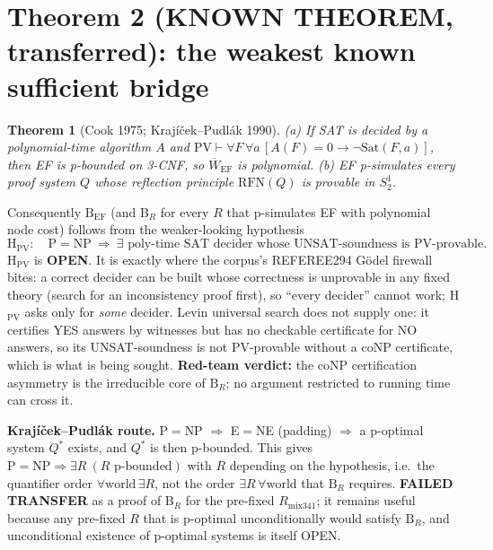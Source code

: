 \documentclass[11pt]{article}
\newtheorem{theorem}{Theorem}
\begin{document}
\section{Theorem 2 (KNOWN THEOREM, transferred): the weakest known sufficient bridge}
\begin{theorem}[Cook 1975; Krajíček--Pudlák 1990]
(a) If SAT is decided by a polynomial-time algorithm $A$ and $\mathrm{PV}\vdash
\forall F\,\forall a\,[A(F)=0\to\neg\mathrm{Sat}(F,a)]$, then EF is p-bounded on 3-CNF, so
$\overline W_{\mathrm{EF}}$ is polynomial.
(b) EF p-simulates every proof system $Q$ whose reflection principle $\mathrm{RFN}(Q)$ is
provable in $S^1_2$.
\end{theorem}
Consequently $\mathrm B_{\mathrm{EF}}$ (and $\mathrm B_R$ for every $R$ that p-simulates EF with
polynomial node cost) follows from the weaker-looking hypothesis
\[
\mathrm{H}_{\mathrm{PV}}:\quad \mathrm P=\mathrm{NP}\ \Longrightarrow\ \exists\text{ poly-time SAT decider whose UNSAT-soundness is PV-provable.}
\]
H$_{\mathrm{PV}}$ is \textbf{OPEN}.  It is exactly where the corpus's REFEREE294 Gödel firewall
bites: a correct decider can be built whose correctness is unprovable in any fixed theory
(search for an inconsistency proof first), so ``every decider'' cannot work; H$_{\mathrm{PV}}$
asks only for \emph{some} decider.  Levin universal search does not supply one: it certifies
YES answers by witnesses but has no checkable certificate for NO answers, so its
UNSAT-soundness is not PV-provable without a coNP certificate, which is what is being sought.
\textbf{Red-team verdict:} the coNP certification asymmetry is the irreducible core of
$\mathrm B_R$; no argument restricted to running time can cross it.

\textbf{Krajíček--Pudlák route.} P$=$NP $\Rightarrow$ E$=$NE (padding) $\Rightarrow$ a
p-optimal system $Q^\ast$ exists, and $Q^\ast$ is then p-bounded.  This gives
$\mathrm{P}=\mathrm{NP}\Rightarrow\exists R\ (R\text{ p-bounded})$ with $R$ depending on the
hypothesis, i.e.\ the quantifier order $\forall\text{world}\,\exists R$, not the order
$\exists R\,\forall\text{world}$ that $\mathrm B_R$ requires.  \textbf{FAILED TRANSFER} as a proof of
$\mathrm B_R$ for the pre-fixed $R_{\mathrm{mix341}}$; it remains useful because any pre-fixed $R$
that is p-optimal unconditionally would satisfy $\mathrm B_R$, and unconditional existence of
p-optimal systems is itself OPEN.
\end{document}
